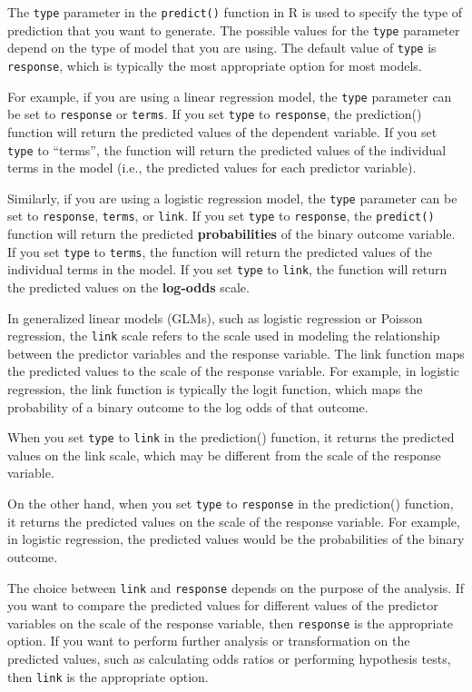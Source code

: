 \documentclass[
]{ctexart}
\begin{document}
The \texttt{type} parameter in the \texttt{predict()} function in R is
used to specify the type of prediction that you want to generate. The
possible values for the \texttt{type} parameter depend on the type of
model that you are using. The default value of \texttt{type} is
\texttt{response}, which is typically the most appropriate option for
most models.

For example, if you are using a linear regression model, the
\texttt{type} parameter can be set to \texttt{response} or
\texttt{terms}. If you set \texttt{type} to \texttt{response}, the
prediction() function will return the predicted values of the dependent
variable. If you set \texttt{type} to ``terms'', the function will
return the predicted values of the individual terms in the model (i.e.,
the predicted values for each predictor variable).

Similarly, if you are using a logistic regression model, the
\texttt{type} parameter can be set to \texttt{response}, \texttt{terms},
or \texttt{link}. If you set \texttt{type} to \texttt{response}, the
\texttt{predict()} function will return the predicted
\textbf{probabilities} of the binary outcome variable. If you set
\texttt{type} to \texttt{terms}, the function will return the predicted
values of the individual terms in the model. If you set \texttt{type} to
\texttt{link}, the function will return the predicted values on the
\textbf{log-odds} scale.

In generalized linear models (GLMs), such as logistic regression or
Poisson regression, the \texttt{link} scale refers to the scale used in
modeling the relationship between the predictor variables and the
response variable. The link function maps the predicted values to the
scale of the response variable. For example, in logistic regression, the
link function is typically the logit function, which maps the
probability of a binary outcome to the log odds of that outcome.

When you set \texttt{type} to \texttt{link} in the prediction()
function, it returns the predicted values on the link scale, which may
be different from the scale of the response variable.

On the other hand, when you set \texttt{type} to \texttt{response} in
the prediction() function, it returns the predicted values on the scale
of the response variable. For example, in logistic regression, the
predicted values would be the probabilities of the binary outcome.

The choice between \texttt{link} and \texttt{response} depends on the
purpose of the analysis. If you want to compare the predicted values for
different values of the predictor variables on the scale of the response
variable, then \texttt{response} is the appropriate option. If you want
to perform further analysis or transformation on the predicted values,
such as calculating odds ratios or performing hypothesis tests, then
\texttt{link} is the appropriate option.
\end{document}
